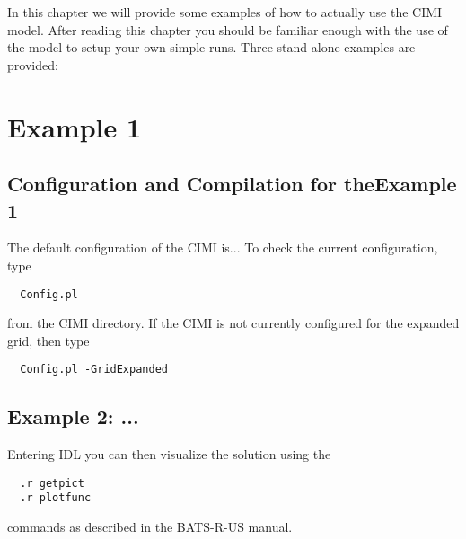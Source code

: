 In this chapter we will provide some examples of how to actually use the 
CIMI model. After reading this chapter you should be familiar enough with the 
use of the model to setup your own simple runs. Three stand-alone examples are 
provided: 
 

\section{Example 1}

\subsection{Configuration and Compilation for theExample 1}
The default configuration of the CIMI is... To check the 
current configuration, type
\begin{verbatim}
  Config.pl
\end{verbatim}
from the CIMI directory. If the CIMI is not currently configured for the expanded grid, then type
\begin{verbatim}
  Config.pl -GridExpanded
\end{verbatim}

\subsection{Example 2: ...}

Entering IDL you can then visualize 
the solution using the 
\begin{verbatim}
  .r getpict
  .r plotfunc
\end{verbatim}
commands as described in the BATS-R-US manual. 

